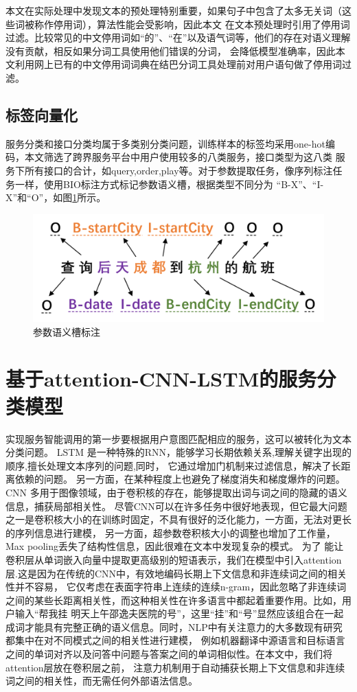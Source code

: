 本文在实际处理中发现文本的预处理特别重要，如果句子中包含了太多无关词（这些词被称作停用词），算法性能会受影响，因此本文
在文本预处理时引用了停用词过滤。比较常见的中文停用词如“的”、“在”以及语气词等，他们的存在对语义理解没有贡献，相反如果分词工具使用他们错误的分词，
会降低模型准确率，因此本文利用网上已有的中文停用词词典在结巴分词工具处理前对用户语句做了停用词过滤。

\subsection{标签向量化}
服务分类和接口分类均属于多类别分类问题，训练样本的标签均采用one-hot编码，本文筛选了跨界服务平台中用户使用较多的八类服务，接口类型为这八类
服务下所有接口的合计，如query,order,play等。对于参数提取任务，像序列标注任务一样，使用BIO标注方式标记参数语义槽，根据类型不同分为
“B-X”、“I-X”和“O”，如图\ref{fig:yuyicao}所示。
\begin{figure}[htbp]
  \centering
  \includegraphics[scale=0.5]{./images/yuyicao.png}
  \caption{参数语义槽标注}
  \label{fig:yuyicao}
\end{figure}


\section{基于attention-CNN-LSTM的服务分类模型}
实现服务智能调用的第一步要根据用户意图匹配相应的服务，这可以被转化为文本分类问题。
LSTM
是一种特殊的RNN，能够学习长期依赖关系,理解关键字出现的顺序,擅长处理文本序列的问题,同时，
它通过增加门机制来过滤信息，解决了长距离依赖的问题。 另一方面，在某种程度上也避免了梯度消失和梯度爆炸的问题。
CNN
多用于图像领域，由于卷积核的存在，能够提取出词与词之间的隐藏的语义信息，捕获局部相关性。
尽管CNN可以在许多任务中很好地表现，但它最大问题之一是卷积核大小的在训练时固定，不具有很好的泛化能力，一方面，无法对更长的序列信息进行建模，
另一方面，超参数卷积核大小的调整也增加了工作量，Max pooling丢失了结构性信息，因此很难在文本中发现复杂的模式。
为了
能让卷积层从单词嵌入向量中提取更高级别的短语表示，我们在模型中引入attention层.这是因为在传统的CNN中，有效地编码长期上下文信息和非连续词之间的相关性并不容易，
它仅考虑在表面字符串上连续的连续n-gram，因此忽略了非连续词之间的某些长距离相关性，而这种相关性在许多语言中都起着重要作用。比如，用户输入“帮我挂
明天上午邵逸夫医院的号”，这里“挂”和“号”显然应该组合在一起成词才能具有完整正确的语义信息。同时，NLP中有关注意力的大多数现有研究都集中在对不同模式之间的相关性进行建模，
例如机器翻译中源语言和目标语言之间的单词对齐以及问答中问题与答案之间的单词相似性。在本文中，我们将attention层放在卷积层之前，
注意力机制用于自动捕获长期上下文信息和非连续词之间的相关性，而无需任何外部语法信息。

